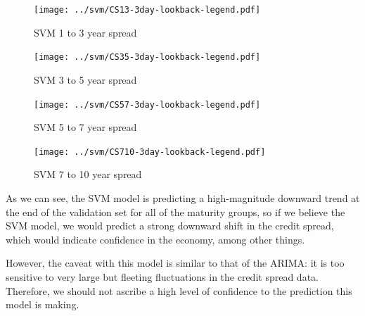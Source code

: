 \documentclass[12pt]{article}
\begin{document}
        \begin{minipage}{0.5\textwidth}
            \begin{figure}[H]
                \centering
                \caption{SVM 1 to 3 year spread}
                \texttt{[image: ../svm/CS13-3day-lookback-legend.pdf]}
                \label{fig:SVM13}
            \end{figure}
        \end{minipage}
        \begin{minipage}{0.5\textwidth}
            \begin{figure}[H]
                \centering
                \caption{SVM 3 to 5 year spread}
                \texttt{[image: ../svm/CS35-3day-lookback-legend.pdf]}
                \label{fig:SVM35}
            \end{figure}
        \end{minipage}

        \begin{minipage}{0.5\textwidth}
            \begin{figure}[H]
                \centering
                \caption{SVM 5 to 7 year spread}
                \texttt{[image: ../svm/CS57-3day-lookback-legend.pdf]}
                \label{fig:SVM57}
            \end{figure}
        \end{minipage}
        \begin{minipage}{0.5\textwidth}
            \begin{figure}[H]
                \centering
                \caption{SVM 7 to 10 year spread}
                \texttt{[image: ../svm/CS710-3day-lookback-legend.pdf]}
                \label{fig:SVM710}
            \end{figure}
        \end{minipage}

        As we can see, the SVM model is predicting a high-magnitude downward trend at the end of the validation set for all of the maturity groups,
        so if we believe the SVM model, we would predict a strong downward shift in the credit spread, which would indicate confidence in the economy, among other things.

        However, the caveat with this model is similar to that of the ARIMA: it is too sensitive to very large but fleeting fluctuations in the credit spread data.
        Therefore, we should not ascribe a high level of confidence to the prediction this model is making.
\end{document}
